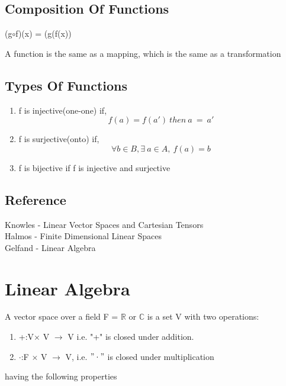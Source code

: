 \documentclass{report}
\begin{document}
\section{Composition Of Functions}
(g$\circ$f)(x) = (g(f(x))

A function is the same as a mapping, which is the same as a transformation 
\section{Types Of Functions}
\begin{enumerate}
    \item f is injective(one-one) if,
    \[f(a) = f(a')\ then\ a\ =\ a'\]
    \item f is surjective(onto) if, 
    \[\forall b \in B, \exists \ a \in A, \  f(a) = b\]
    \item f is bijective if f is injective and surjective
    \end{enumerate}   
\section*{Reference}
Knowles - Linear Vector Spaces and Cartesian Tensors\\
Halmos - Finite Dimensional Linear Spaces\\
Gelfand - Linear Algebra
\chapter{Linear Algebra}
A vector space over a field F = $\mathbb{R}$ or $\mathbb{C}$ is a set V with two operations:
\begin{enumerate}
\item +:V$\times$ V $\rightarrow$ V i.e. "+" is closed under addition.

\item $\cdot$:F $\times$ V $\rightarrow$ V, i.e. $"\cdot"$ is closed under multiplication
\end{enumerate}
having the following properties
\end{document}
